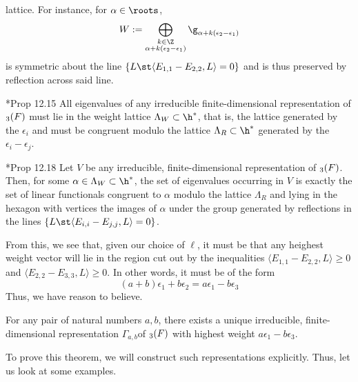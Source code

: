 \documentclass[11pt,leqno,oneside]{amsart}
\numberwithin{thm}{section}
\newcommand{\rootlattice}{\Lambda_R}
\newcommand{\weightlattice}{\Lambda_W}
\begin{document}
lattice. For instance, for \(\alpha \in \roots\), \[
  W := \bigoplus_{\substack{k \in \Z \\ \alpha+k(\epsilon_2-\epsilon_1)}} \g_{\alpha+k(\epsilon_2-\epsilon_1)}
\]
is symmetric about the line \(\{L \st \langle E_{1,1}-E_{2,2}, L
\rangle = 0\}\) and is thus preserved by reflection across said
line. 
\begin{prop}
  \cite{fulton}*{Prop 12.15} All eigenvalues of any irreducible
  finite-dimensional representation 
  of \(\sl_3(F)\) must lie in the weight lattice \(\weightlattice
  \subset \h^*\), that is, the lattice generated by the \(\epsilon_i\)
  and must be congruent 
  modulo the lattice \(\rootlattice \subset \h^*\) generated by the
  \(\epsilon_i-\epsilon_j\). 
\end{prop}
\begin{prop}
  \cite{fulton}*{Prop 12.18} Let \(V\) be any irreducible,
  finite-dimensional representation of \(\sl_3(F)\). Then, for some
  \(\alpha \in \weightlattice \subset \h^*\), the set of eigenvalues
  occurring in \(V\) is exactly the set of linear functionals
  congruent to \(\alpha\) modulo the lattice \(\rootlattice\) and
  lying in the hexagon with vertices the images of \(\alpha\) under
  the group generated by reflections in the lines \(\{L \st \langle
  E_{i,i}-E_{j,j},L \rangle = 0\}\). 
\end{prop}
From this, we see that, given our choice of \(\ell\), it must be that
any heighest weight vector will lie in the region cut out by the
inequalities \(\langle
E_{1,1}-E_{2,2},L \rangle \geq 0\) and \(\langle E_{2,2}-E_{3,3},L
\rangle \geq 0\). In other words, it must be of the form \[
  (a+b)\epsilon_1 + b \epsilon_2 = a \epsilon_1 - b \epsilon_3
\]
Thus, we have reason to believe.
\begin{thm}\label{pair-gives-unique-irred-sl3-rep}
  For any pair of natural numbers \(a,b\), there exists a unique
  irreducible, finite-dimensional representation \(\Gamma_{a,b}\)of
  \(\sl_3(F)\) with highest weight \(a\epsilon_1-b\epsilon_3\).
\end{thm}
To prove this theorem, we will construct such representations
explicitly. Thus, let us look at some examples.
\end{document}
